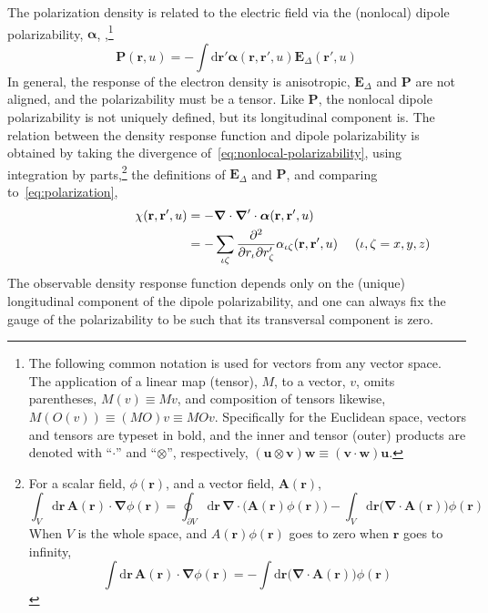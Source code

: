 The polarization density is related to the electric field via the (nonlocal) dipole polarizability, $\boldsymbol\alpha$, \citep{HuntJCP83},\footnote{
The following common notation is used for vectors from any vector space.
The application of a linear map (tensor), $M$, to a vector, $v$, omits parentheses, $M(v)\equiv Mv$, and composition of tensors likewise, $M(O(v))\equiv(MO)v\equiv MOv$.
Specifically for the Euclidean space, vectors and tensors are typeset in bold, and the inner and tensor (outer) products are denoted with ``$\cdot$'' and ``$\otimes$'', respectively, $(\mathbf u\otimes\mathbf v)\mathbf w\equiv(\mathbf v\cdot\mathbf w)\mathbf u$.
}
\begin{equation}
  \mathbf P(\mathbf r,u)=-\int\mathrm d\mathbf r'\boldsymbol\alpha(\mathbf r,\mathbf r',u)\mathbf E_\Delta(\mathbf r',u)
  \label{eq:nonlocal-polarizability}
\end{equation}
In general, the response of the electron density is anisotropic, $\mathbf E_\Delta$ and $\mathbf P$ are not aligned, and the polarizability must be a tensor.
Like $\mathbf P$, the nonlocal dipole polarizability is not uniquely defined, but its longitudinal component is.
The relation between the density response function and dipole polarizability is obtained by taking the divergence of~\eqref{eq:nonlocal-polarizability}, using integration by parts,\footnote{
For a scalar field, $\phi(\mathbf r)$, and a vector field, $\mathbf A(\mathbf r)$,
\[ \int_V\mathrm d\mathbf r\,\mathbf A(\mathbf r)\cdot\boldsymbol\nabla\phi(\mathbf r)=\oint_{\partial V}\mathrm d\mathbf r\,\boldsymbol\nabla\cdot\big(\mathbf A(\mathbf r)\phi(\mathbf r)\!\big)-\int_V\mathrm d\mathbf r\big(\boldsymbol\nabla\cdot\mathbf A(\mathbf r)\!\big)\phi(\mathbf r) \]
When $V$ is the whole space, and $A(\mathbf r)\phi(\mathbf r)$ goes to zero when $\mathbf r$ goes to infinity,
\[ \int\mathrm d\mathbf r\,\mathbf A(\mathbf r)\cdot\boldsymbol\nabla\phi(\mathbf r)=-\int\mathrm d\mathbf r\big(\boldsymbol\nabla\cdot\mathbf A(\mathbf r)\!\big)\phi(\mathbf r) \]
}
the definitions of $\mathbf E_\Delta$ and $\mathbf P$, and comparing to~\eqref{eq:polarization},
\begin{equation}
\begin{aligned}
  \chi(\mathbf r,\mathbf r',u)&=-\boldsymbol\nabla\cdot\boldsymbol\nabla'\cdot\boldsymbol\alpha(\mathbf r,\mathbf r',u)
  \label{eq:alpha-chi} \\
  &=-\sum_{\iota\zeta}\frac{\partial^2}{\partial r_\iota\partial r'_\zeta}\alpha_{\iota\zeta}(\mathbf r,\mathbf r',u)
  \makebox[0pt]{\hspace{0.25\linewidth}$(\iota,\zeta=x,y,z)$}
\end{aligned}
\end{equation}
The observable density response function depends only on the (unique) longitudinal component of the dipole polarizability, and one can always fix the gauge of the polarizability to be such that its transversal component is zero.


